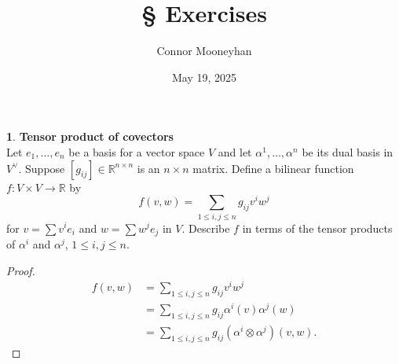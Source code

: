 \documentclass[12pt]{article}
\title{\S\arabic{section} Exercises}
\author{Connor Mooneyhan}
\date{May 19, 2025}
\theoremstyle{definition}
\newtheorem{ex}{}[section]
\begin{document}
\maketitle

\begin{ex}
	\textbf{Tensor product of covectors}\\
	Let $e_1, \dots, e_n$ be a basis for a vector space $V$ and let $\alpha^1, \dots, \alpha^n$ be its dual basis in $V^\vee$.
	Suppose $[g_{ij}] \in \mathbb{R}^{n \times n}$ is an $n \times n$ matrix.
	Define a bilinear function $f: V \times V \to \mathbb{R}$ by \begin{equation*}
		f(v, w) = \sum_{1 \leq i,j \leq n} g_{ij}v^iw^j
	\end{equation*}
	for $v = \sum v^i e_i$ and $w = \sum w^je_j$ in $V$.
	Describe $f$ in terms of the tensor products of $\alpha^i$ and $\alpha^j$, $1 \leq i, j \leq n$.
\end{ex}
\begin{proof}
	\begin{align*}
		f(v, w) & = \sum_{1 \leq i,j \leq n} g_{ij}v^iw^j                          \\
		        & = \sum_{1 \leq i,j \leq n} g_{ij}\alpha^i(v)\alpha^j(w)          \\
		        & = \sum_{1 \leq i,j \leq n} g_{ij}(\alpha^i\otimes\alpha^j)(v,w).
	\end{align*}
\end{proof}
\end{document}
